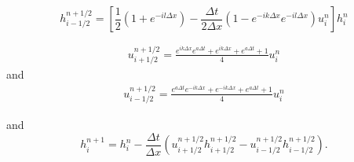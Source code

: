 \documentclass[12pt]{article}
\begin{document}
\[
h^{n + 1/2}_{i- 1/2} = \left[\frac{1}{2}\left(1 + e^{-il\Delta x}\right) - \frac{\Delta t}{2\Delta x}\left(1  - e^{-ik\Delta x}e^{-il\Delta x}\right)u^n_{i} \right] h^n_i
\]

\begin{gather}
u^{n + 1/2}_{i+ 1/2} = \frac{e^{ik\Delta x}e^{a\Delta t} + e^{ik\Delta x} + e^{a\Delta t} + 1 }{4}u^{n}_{i}
\end{gather}
and
\begin{gather}
u^{n + 1/2}_{i- 1/2} = \frac{e^{a\Delta t}e^{-ik\Delta x} +  e^{-ik\Delta x} + e^{a\Delta t} + 1 }{4}u^{n}_{i}
\end{gather}


and
$$
h^{n+1}_i = h^{n}_i - \frac{\Delta t}{\Delta x}\left(u^{n + 1/2}_{i+ 1/2}h^{n + 1/2}_{i+ 1/2} - u^{n + 1/2}_{i- 1/2}h^{n + 1/2}_{i- 1/2}\right).
$$
\end{document}
